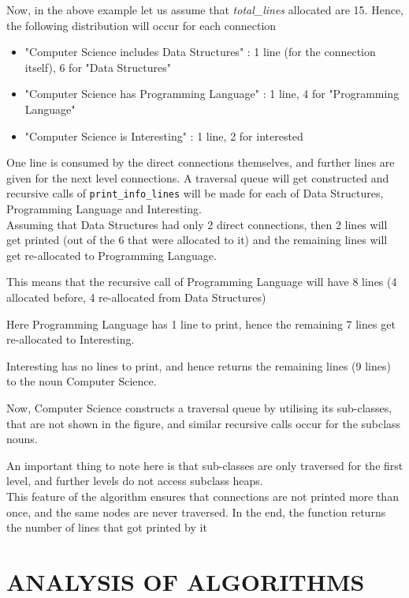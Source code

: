 \documentclass[conference]{IEEEtran}
\begin{document}
Now, in the above example let us assume that \textit{total\_lines} allocated are 15. Hence, the following distribution will occur for each connection
\begin{itemize}
\item "Computer Science includes Data Structures" : 1 line (for the connection itself), 6 for "Data Structures"
\item "Computer Science has Programming Language" : 1 line, 4 for "Programming Language"
\item "Computer Science is Interesting" : 1 line, 2 for interested
\end{itemize}

One line is consumed by the direct connections themselves, and further lines are given for the next level connections.
A traversal queue will get constructed and recursive calls of \texttt{print\_info\_lines} will be made for each of Data Structures, Programming Language and Interesting.\\

Assuming that Data Structures had only 2 direct connections, then 2 lines will get printed (out of the 6 that were allocated to it) and the remaining lines will get re-allocated to Programming Language.

This means that the recursive call of Programming Language will have 8 lines (4 allocated before, 4 re-allocated from Data Structures)

Here Programming Language has 1 line to print, hence the remaining 7 lines get re-allocated to Interesting.

Interesting has no lines to print, and hence returns the remaining lines (9 lines) to the noun Computer Science.

Now, Computer Science constructs a traversal queue by utilising its sub-classes, that are not shown in the figure, and similar recursive calls occur for the subclass nouns.

An important thing to note here is that sub-classes are only traversed for the first level, and further levels do not access subclass heaps.\\

This feature of the algorithm ensures that connections are not printed more than once, and the same nodes are never traversed.
In the end, the function returns the number of lines that got printed by it

\section{ANALYSIS OF ALGORITHMS}
\end{document}

